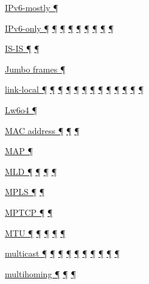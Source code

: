 \documentclass[
]{article}
\begin{document}
\hyperref[dual-stack-scenarios]{IPv6-mostly ¶}

\hyperref[routing]{IPv6-only ¶}
\hyperref[source-and-destination-address-selection]{¶}
\hyperref[coexistence-with-legacy-ipv4]{¶}
\hyperref[dual-stack-scenarios]{¶}
\hyperref[translation-and-ipv4-as-a-service]{¶} \hyperref[tunnels]{¶}
\hyperref[security]{¶} \hyperref[deployment-by-carriers]{¶}
\hyperref[advanced-troubleshooting]{¶}

\hyperref[routing]{IS-IS ¶} \hyperref[routing-operation]{¶}

\hyperref[packet-size-and-jumbo-frames]{Jumbo frames ¶}

\hyperref[address-resolution]{link-local ¶} \hyperref[addresses]{¶}
\hyperref[auto-configuration]{¶} \hyperref[dns]{¶}
\hyperref[source-and-destination-address-selection]{¶}
\hyperref[filtering]{¶} \hyperref[network-design]{¶}
\hyperref[basic-windows-commands]{¶} \hyperref[energy-consumption]{¶}
\hyperref[multi-prefix-operation]{¶}
\hyperref[deployment-in-the-home]{¶} \hyperref[troubleshooting]{¶}
\hyperref[tools]{¶}

\hyperref[translation-and-ipv4-as-a-service]{Lw6o4 ¶}

\hyperref[address-resolution]{MAC address ¶} \hyperref[addresses]{¶}
\hyperref[address-and-prefix-management]{¶}

\hyperref[translation-and-ipv4-as-a-service]{MAP ¶}

\hyperref[address-resolution]{MLD ¶}
\hyperref[layer-2-considerations]{¶} \hyperref[troubleshooting]{¶}
\hyperref[advanced-troubleshooting]{¶}

\hyperref[layer-2-functions]{MPLS ¶} \hyperref[tunnels]{¶}

\hyperref[transport-protocols]{MPTCP ¶} \hyperref[multihoming]{¶}

\hyperref[extension-headers-and-options]{MTU ¶}
\hyperref[layer-2-functions]{¶} \hyperref[packet-format]{¶}
\hyperref[packet-size-and-jumbo-frames]{¶}
\hyperref[advanced-troubleshooting]{¶}

\hyperref[address-resolution]{multicast ¶} \hyperref[addresses]{¶}
\hyperref[auto-configuration]{¶} \hyperref[layer-2-functions]{¶}
\hyperref[ipv6-primary-differences-from-ipv4]{¶} \hyperref[filtering]{¶}
\hyperref[layer-2-considerations]{¶} \hyperref[energy-consumption]{¶}
\hyperref[troubleshooting]{¶} \hyperref[advanced-troubleshooting]{¶}

\hyperref[multi-prefix-operation]{multihoming ¶}
\hyperref[multihoming]{¶} \hyperref[deployment-in-the-enterprise]{¶}
\end{document}
